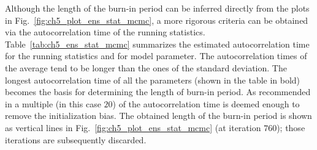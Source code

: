 Although the length of the burn-in period can be inferred directly from the plots in Fig.~\ref{fig:ch5_plot_ens_stat_mcmc}, a more rigorous criteria can be obtained via the autocorrelation time of the running statistics.
Table~\ref{tab:ch5_ens_stat_mcmc} summarizes the estimated autocorrelation time for the running statistics and for model parameter.
The autocorrelation times of the average tend to be longer than the ones of the standard deviation. 
The longest autocorrelation time of all the parameters (shown in the table in bold) becomes the basis for determining the length of burn-in period.
As recommended in \cite{Sokal1997} a multiple (in this case $20$) of the autocorrelation time is deemed enough to remove the initialization bias.
The obtained length of the burn-in period is shown as vertical lines in Fig.~\ref{fig:ch5_plot_ens_stat_mcmc} (at iteration $760$); those iterations are subsequently discarded.
